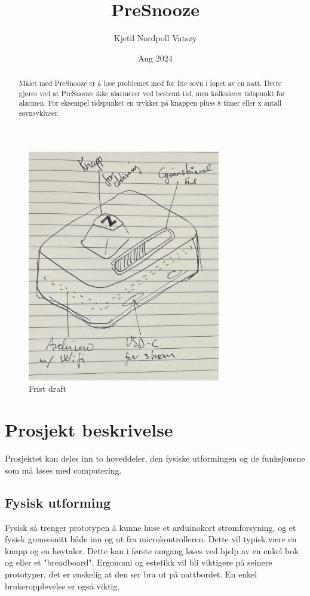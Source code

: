 \documentclass[12pt, a4paper]{article}
\begin{document}
\title{PreSnooze} 
\author{Kjetil Nordpoll Vatsøy}
\date{Aug 2024}

\maketitle

\pagebreak

\begin{figure}[h]
\centering
\includegraphics[width=0.75\textwidth]{IMG_2505.png}
\caption{Frist draft}
\end{figure}   

\begin{abstract}
Målet med PreSnooze er å løse problemet med for lite søvn i løpet av en natt. 
Dette gjøres ved at PreSnooze ikke alarmerer ved bestemt tid, men kalkulerer tidspunkt for alarmen. For eksempel tidspunket en trykker på knappen pluss 8 timer eller x antall søvnsykluser.
\end{abstract}

\pagebreak

\section{Prosjekt beskrivelse}

Prosjektet kan deles inn to hoveddeler, den fysiske utformingen og de funksjonene som må løses med computering. 
\subsection*{Fysisk utforming}
Fysisk så trenger prototypen å kunne huse et arduinokort strømforsyning, og et fysisk grensesnitt både inn og ut fra microkontrolleren. 
Dette vil typisk være en knapp og en høytaler. Dette kan i første omgang løses ved hjelp av en enkel bok og eller et "breadboard".
Ergonomi og estetikk vil bli viktigere på seinere prototyper, det er ønskelig at den ser bra ut på nattbordet. 
En enkel brukeropplevelse er også viktig. 
\end{document}
